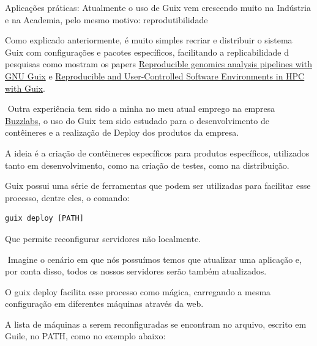 \documentclass[bigger]{beamer}
\begin{document}
\begin{frame}[label={sec:org4a68460}]{Aplicações práticas:}
Atualmente o uso de Guix vem crescendo muito na Indústria e na Academia, pelo mesmo motivo: reprodutibilidade

Como explicado anteriormente, é muito simples recriar e distribuir o sistema Guix com configurações e pacotes
específicos, facilitando a replicabilidade d pesquisas como mostram os papers
\href{https://www.biorxiv.org/content/10.1101/298653v2}{Reproducible genomics analysis pipelines with GNU Guix} e
\href{https://inria.hal.science/hal-01161771/en}{Reproducible and User-Controlled Software Environments in HPC with Guix}.
\end{frame}
\begin{frame}[label={sec:org64e4b19},fragile]{⁤}
 Outra experiência tem sido a minha no meu atual emprego na empresa \href{https://www.buzzlabs.com.br/}{Buzzlabs}, o uso do Guix tem sido estudado
para o desenvolvimento de contêineres e a realização de Deploy dos produtos da empresa.

A ideia é a criação de contêineres específicos para produtos específicos, utilizados tanto em desenvolvimento,
como na criação de testes, como na distribuição.

Guix possui uma série de ferramentas que podem ser utilizadas para facilitar esse processo, dentre eles, o
comando:
\begin{verbatim}
guix deploy [PATH]
\end{verbatim}
Que permite reconfigurar servidores não localmente.
\end{frame}
\begin{frame}[label={sec:org6136a98}]{⁤}
Imagine o cenário em que nós possuímos temos que atualizar uma aplicação e, por conta disso, todos os nossos
servidores serão também atualizados.

O guix deploy facilita esse processo como mágica, carregando a mesma configuração em diferentes máquinas
através da web.

A lista de máquinas a serem reconfiguradas se encontram no arquivo, escrito em Guile, no PATH, como no exemplo
abaixo:
\end{frame}
\end{document}

